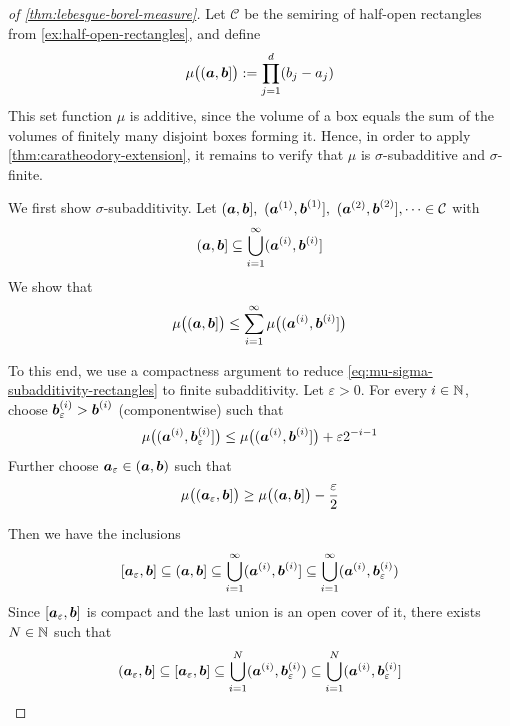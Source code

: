 \begin{proof}[of \autoref{thm:lebesgue-borel-measure}]
Let
\(
\mathcal{C}
\)
be the semiring of half-open rectangles from \autoref{ex:half-open-rectangles}, and define
\[
\mu\bigl(({\boldsymbol{a}},{\boldsymbol{b}}]\bigr)
:=
\prod_{j=1}^d (b_j-a_j)
\]
This set function \(\mu\) is additive, since the volume of a box equals the sum of the volumes of finitely many disjoint boxes forming it.
Hence, in order to apply \autoref{thm:caratheodory-extension}, it remains to verify that \(\mu\) is \(\sigma\)-subadditive and \(\sigma\)-finite.

We first show \(\sigma\)-subadditivity. Let
\(
(\vect{a},\vect{b}],\ (\vect{a}^{(1)},\vect{b}^{(1)}],\ (\vect{a}^{(2)},\vect{b}^{(2)}],\dots \in \mathcal{C}
\)
with
\[
({\boldsymbol{a}},{\boldsymbol{b}}] \subseteq \bigcup_{i=1}^{\infty} ({\boldsymbol{a}}^{(i)},{\boldsymbol{b}}^{(i)}]
\]
We show that
\begin{equation}
\mu\bigl(({\boldsymbol{a}},{\boldsymbol{b}}]\bigr)
\le
\sum_{i=1}^{\infty} \mu\bigl(({\boldsymbol{a}}^{(i)},{\boldsymbol{b}}^{(i)}]\bigr)
\label{eq:mu-sigma-subadditivity-rectangles}
\end{equation}

To this end, we use a compactness argument to reduce \eqref{eq:mu-sigma-subadditivity-rectangles} to finite subadditivity.
Let \(\varepsilon>0\). For every \(i\in\mathbb{N}\), choose
\(
{\boldsymbol{b}}^{(i)}_\varepsilon > {\boldsymbol{b}}^{(i)}
\)
(componentwise) such that
\begin{equation}\label{eq:lebesgue-borel-choose-b-epsilon}
\mu\bigl(({\boldsymbol{a}}^{(i)},{\boldsymbol{b}}^{(i)}_\varepsilon]\bigr)
\le
\mu\bigl(({\boldsymbol{a}}^{(i)},{\boldsymbol{b}}^{(i)}]\bigr) + \varepsilon 2^{-i-1}
\end{equation}
Further choose \({\boldsymbol{a}}_\varepsilon \in ({\boldsymbol{a}},{\boldsymbol{b}})\) such that
\begin{equation}\label{eq:lebesgue-borel-choose-a-epsilon}
\mu\bigl(({\boldsymbol{a}}_\varepsilon,{\boldsymbol{b}}]\bigr)
\ge
\mu\bigl(({\boldsymbol{a}},{\boldsymbol{b}}]\bigr) - \frac{\varepsilon}{2}
\end{equation}

Then we have the inclusions
\[
[{\boldsymbol{a}}_\varepsilon,{\boldsymbol{b}}]
\subseteq
({\boldsymbol{a}},{\boldsymbol{b}}]
\subseteq
\bigcup_{i=1}^{\infty} ({\boldsymbol{a}}^{(i)},{\boldsymbol{b}}^{(i)}]
\subseteq
\bigcup_{i=1}^{\infty} ({\boldsymbol{a}}^{(i)},{\boldsymbol{b}}^{(i)}_\varepsilon)
\]
Since \([{\boldsymbol{a}}_\varepsilon,{\boldsymbol{b}}]\) is compact and the last union is an open cover of it, there exists \(N\in\mathbb{N}\) such that
\[
({\boldsymbol{a}}_\varepsilon,{\boldsymbol{b}}]
\subseteq
[{\boldsymbol{a}}_\varepsilon,{\boldsymbol{b}}]
\subseteq
\bigcup_{i=1}^{N} ({\boldsymbol{a}}^{(i)},{\boldsymbol{b}}^{(i)}_\varepsilon)
\subseteq
\bigcup_{i=1}^{N} ({\boldsymbol{a}}^{(i)},{\boldsymbol{b}}^{(i)}_\varepsilon]
\]



\end{proof}
